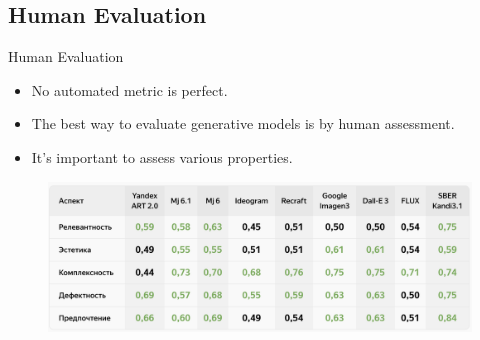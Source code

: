 \documentclass{beamer}
\begin{document}
\subsection{Human Evaluation}
\begin{frame}{Human Evaluation}
	\begin{itemize}
		\item No automated metric is perfect.
		\item The best way to evaluate generative models is by human assessment.
		\item It's important to assess various properties.
	\end{itemize}
	\eqpause
	\begin{figure}
		\includegraphics[width=1.0\linewidth]{figs/yaart_2.5}
	\end{figure}
\end{frame}
\end{document}
